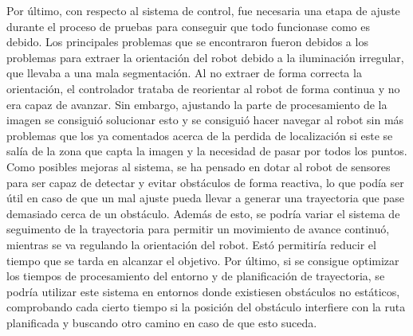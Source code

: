 Por último, con respecto al sistema de control, fue necesaria una etapa de ajuste durante el proceso de pruebas para conseguir que todo funcionase como es debido. Los principales problemas que se encontraron fueron debidos a los problemas para extraer la orientación del robot debido a la iluminación irregular, que llevaba a una mala segmentación. Al no extraer de forma correcta la orientación, el controlador trataba de reorientar al robot de forma continua y no era capaz de avanzar. Sin embargo, ajustando la parte de procesamiento de la imagen se consiguió solucionar esto y se consiguió hacer navegar al robot sin más problemas que los ya comentados acerca de la perdida de localización si este se salía de la zona que capta la imagen y la necesidad de pasar por todos los puntos.\\

Como posibles mejoras al sistema, se ha pensado en dotar al robot de sensores para ser capaz de detectar y evitar obstáculos de forma reactiva, lo que podía ser útil en caso de que un mal ajuste pueda llevar a generar una trayectoria que pase demasiado cerca de un obstáculo. Además de esto, se podría variar el sistema de seguimento de la trayectoria para permitir un movimiento de avance continuó, mientras se va regulando la orientación del robot. Estó permitiría reducir el tiempo que se tarda en alcanzar el objetivo. Por último, si se consigue optimizar los tiempos de procesamiento del entorno y de planificación de trayectoria, se podría utilizar este sistema en entornos donde existiesen obstáculos no estáticos, comprobando cada cierto tiempo si la posición del obstáculo interfiere con la ruta planificada y buscando otro camino en caso de que esto suceda.\\  